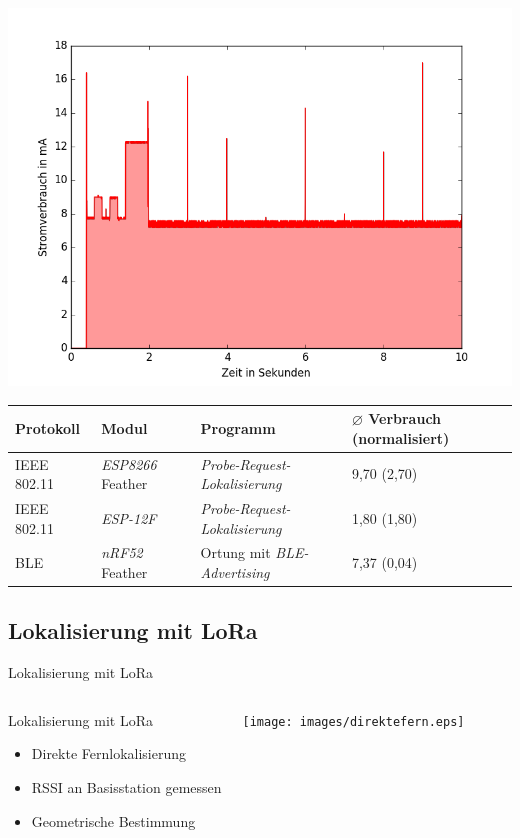 \documentclass[18pt]{beamer}
\begin{document}
\begin{frame}
	\begin{minipage}[c][\textheight][c]{\textwidth}
		\centering
		\includegraphics[height=0.95\textheight]{plots/blue.png}
	\end{minipage}
\end{frame}

\begin{frame}
	\begin{tabular}{l|l|p{3.1cm}|R{2.1cm}}
		Protokoll & Modul & Programm  & $\varnothing$ Verbrauch (normalisiert)\\
		\hline
		IEEE 802.11 & \emph{ESP8266} Feather & \emph{Probe-Request-Lokalisierung} & 9,70 (2,70)\\
		IEEE 802.11 & \emph{ESP-12F} & \emph{Probe-Request-Lokalisierung} & 1,80 (1,80)\\
		\hline
		BLE & \emph{nRF52} Feather & Ortung mit \emph{BLE-Advertising} & 7,37 (0,04)\\
	\end{tabular}
\end{frame}

\subsection{Lokalisierung mit LoRa}
\begin{frame}{Lokalisierung mit LoRa}
	\begin{columns}
			\begin{block}{Lokalisierung mit LoRa}
				\begin{itemize}
					\item Direkte Fernlokalisierung
					\item RSSI an Basisstation gemessen
					\item Geometrische Bestimmung
				\end{itemize}
			\end{block}
			\centering
			\texttt{[image: images/direktefern.eps]}
	\end{columns}
\end{frame}
\end{document}
